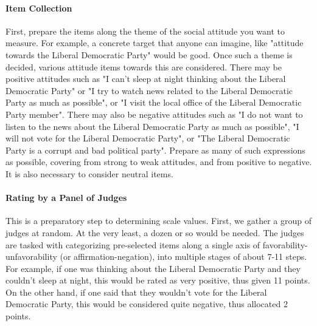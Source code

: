 \documentclass{ltjsbook}
\begin{document}
\paragraph{Item Collection} First, prepare the items along the theme of the social attitude you want to measure. For example, a concrete target that anyone can imagine, like "attitude towards the Liberal Democratic Party" would be good. Once such a theme is decided, various attitude items towards this are considered. There may be positive attitudes such as "I can't sleep at night thinking about the Liberal Democratic Party" or "I try to watch news related to the Liberal Democratic Party as much as possible", or "I visit the local office of the Liberal Democratic Party member". There may also be negative attitudes such as "I do not want to listen to the news about the Liberal Democratic Party as much as possible", "I will not vote for the Liberal Democratic Party", or "The Liberal Democratic Party is a corrupt and bad political party". Prepare as many of such expressions as possible, covering from strong to weak attitudes, and from positive to negative. It is also necessary to consider neutral items.

\paragraph{Rating by a Panel of Judges} This is a preparatory step to determining scale values. First, we gather a group of judges at random. At the very least, a dozen or so would be needed. The judges are tasked with categorizing pre-selected items along a single axis of favorability-unfavorability (or affirmation-negation), into multiple stages of about 7-11 steps. For example, if one was thinking about the Liberal Democratic Party and they couldn't sleep at night, this would be rated as very positive, thus given 11 points. On the other hand, if one said that they wouldn't vote for the Liberal Democratic Party, this would be considered quite negative, thus allocated 2 points.
\end{document}
